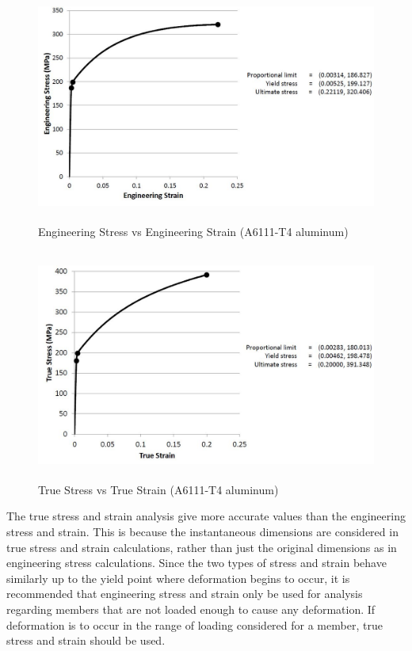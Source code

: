 \documentclass[12pt]{article}
\begin{document}
\begin{figure}[h!]  
  \centering
      \includegraphics[width=5in,height=3in]{emblom_engr.JPG}
      \caption{Engineering Stress vs Engineering Strain (A6111-T4 aluminum)}
\end{figure}

\bigskip
\bigskip

 \begin{figure}[h!]
   \centering
       \includegraphics[width=5in,height=3in]{emblom_true.JPG}
         \caption{True Stress vs True Strain (A6111-T4 aluminum)}
\end{figure}


\newpage

The true stress and strain analysis give more accurate values than the engineering stress and strain. This is because the instantaneous dimensions are considered in true stress and strain calculations, rather than just the original dimensions as in engineering stress calculations. Since the two types of stress and strain behave similarly up to the yield point where deformation begins to occur, it is recommended that engineering stress and strain only be used for analysis regarding members that are not loaded enough to cause any deformation. If deformation is to occur in the range of loading considered for a member, true stress and strain should be used. 
\bigskip
\end{document}
